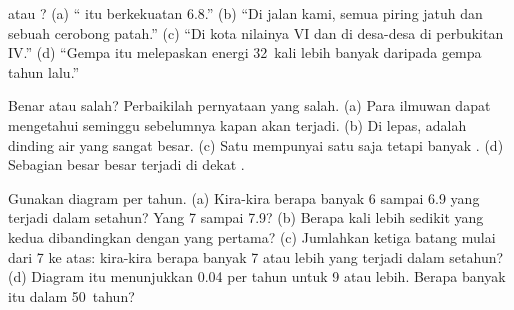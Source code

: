 \begin{exercise}[$\star$]\label{exo:g7:earthquakes:3}
 atau ? (a) `` itu berkekuatan 6.8.'' (b) ``Di
jalan kami, semua piring jatuh dan sebuah cerobong patah.'' (c) ``Di kota
nilainya VI dan di desa-desa di perbukitan IV.'' (d) ``Gempa itu
melepaskan energi 32~kali lebih banyak daripada gempa tahun lalu.''
\end{exercise}

\begin{exercise}[$\star$]\label{exo:g7:earthquakes:4}
Benar atau salah? Perbaikilah pernyataan yang salah. (a) Para ilmuwan dapat
mengetahui seminggu sebelumnya kapan  akan terjadi. (b) Di
 lepas,  adalah dinding air yang sangat besar. (c) Satu  mempunyai satu  saja tetapi banyak . (d) Sebagian
besar  besar terjadi di dekat .
\end{exercise}

\begin{exercise}[$\star\star$]\label{exo:g7:earthquakes:5}
Gunakan diagram  per tahun. (a) Kira-kira berapa banyak   6 sampai 6.9 yang terjadi dalam setahun? Yang
 7 sampai 7.9? (b) Berapa kali lebih sedikit yang kedua
dibandingkan dengan yang pertama? (c) Jumlahkan ketiga batang mulai dari 7
ke atas: kira-kira berapa banyak   7 atau lebih yang
terjadi dalam setahun? (d) Diagram itu menunjukkan 0.04 per tahun untuk
 9 atau lebih. Berapa banyak itu dalam 50~tahun?
\end{exercise}

